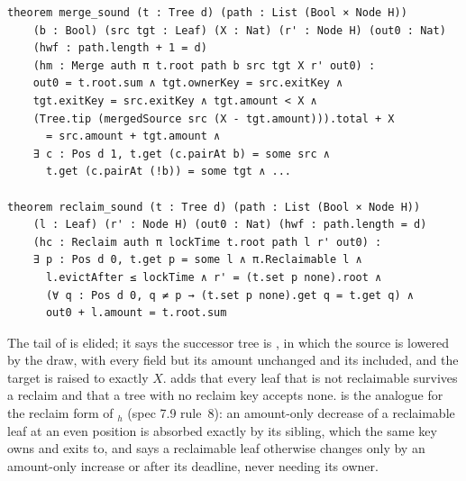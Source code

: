 \begin{lstlisting}
theorem merge_sound (t : Tree d) (path : List (Bool × Node H))
    (b : Bool) (src tgt : Leaf) (X : Nat) (r' : Node H) (out0 : Nat)
    (hwf : path.length + 1 = d)
    (hm : Merge auth π t.root path b src tgt X r' out0) :
    out0 = t.root.sum ∧ tgt.ownerKey = src.exitKey ∧
    tgt.exitKey = src.exitKey ∧ tgt.amount < X ∧
    (Tree.tip (mergedSource src (X - tgt.amount))).total + X
      = src.amount + tgt.amount ∧
    ∃ c : Pos d 1, t.get (c.pairAt b) = some src ∧
      t.get (c.pairAt (!b)) = some tgt ∧ ...

theorem reclaim_sound (t : Tree d) (path : List (Bool × Node H))
    (l : Leaf) (r' : Node H) (out0 : Nat) (hwf : path.length = d)
    (hc : Reclaim auth π lockTime t.root path l r' out0) :
    ∃ p : Pos d 0, t.get p = some l ∧ π.Reclaimable l ∧
      l.evictAfter ≤ lockTime ∧ r' = (t.set p none).root ∧
      (∀ q : Pos d 0, q ≠ p → (t.set p none).get q = t.get q) ∧
      out0 + l.amount = t.root.sum
\end{lstlisting}

The tail of  is elided; it says the successor tree is
, in which the source is lowered by the draw, with every
field but its amount unchanged and its  included, and the
target is raised to exactly $X$.  adds that
every leaf that is not reclaimable survives a reclaim and that a tree
with no reclaim key accepts none.  is the
analogue for the reclaim form of $_h$ (spec 7.9 rule~8): an
amount-only decrease of a reclaimable leaf at an even position is
absorbed exactly by its sibling, which the same key owns and exits to,
and  says a reclaimable leaf otherwise
changes only by an amount-only increase or after its deadline, never
needing its owner.


